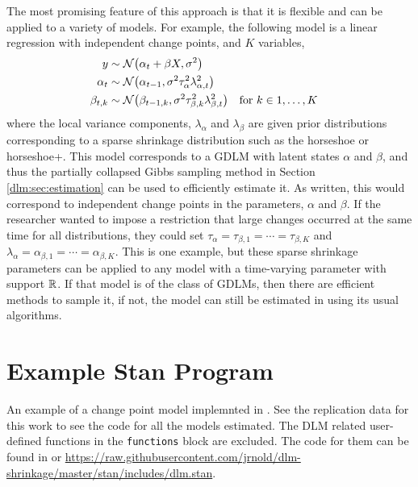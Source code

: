 \documentclass[12pt]{article}
\begin{document}
The most promising feature of this approach is that it is flexible and can be applied to a variety of models.
For example, the following model is a linear regression with independent change points, and $K$ variables,
\begin{equation}
  \label{dlm:eq:32}
  \begin{aligned}[t]
  y & \sim \mathcal{N}\mathopen{}\left(\alpha_{t} + \beta X, \sigma^{2}\right)\mathclose{} \\
  \alpha_{t} & \sim \mathcal{N}\mathopen{}\left(\alpha_{t-1}, \sigma^{2} \tau_{\alpha}^{2} \lambda_{\alpha,t}^{2}\right)\mathclose{} \\
  \beta_{t,k} & \sim \mathcal{N}\mathopen{}\left(\beta_{t-1,k}, \sigma^{2} \tau_{\beta, k}^{2} \lambda_{\beta,t}^{2}\right)\mathclose{} &&\text{for $k \in 1, \dots, K$}
  \end{aligned}
\end{equation}
where the local variance components, $\lambda_{\alpha}$ and $\lambda_{\beta}$ are given prior distributions corresponding to a sparse shrinkage distribution such as the horseshoe or horseshoe+.
This model corresponds to a GDLM with latent states $\alpha$ and $\beta$, and thus the partially collapsed Gibbs sampling method in Section \ref{dlm:sec:estimation} can be used to efficiently estimate it.
As written, this would correspond to independent change points in the parameters, $\alpha$ and $\beta$.
If the researcher wanted to impose a restriction that large changes occurred at the same time for all distributions, they could set $\tau_{\alpha} = \tau_{\beta,1} = \cdots = \tau_{\beta, K}$ and $\lambda_{\alpha} = \alpha_{\beta,1} = \cdots = \alpha_{\beta, K}$.
This is one example, but these sparse shrinkage parameters can be applied to any model with a time-varying parameter with support $\mathbb{R}$.
If that model is of the class of GDLMs, then there are efficient methods to sample it, if not, the model can still be estimated in \Stan{} using its usual algorithms.

\section{Example Stan Program}
\label{dlm:sec:example-stan-program}

An example of a change point model implemnted in \Stan{}.
See the replication data for this work to see the code for all the \Stan{} models estimated.
The DLM related user-defined functions in the \texttt{functions} block are excluded.
The code for them can be found in \textcite{Arnold2015c} or \url{https://raw.githubusercontent.com/jrnold/dlm-shrinkage/master/stan/includes/dlm.stan}.


\printbibliography{}
\end{document}
